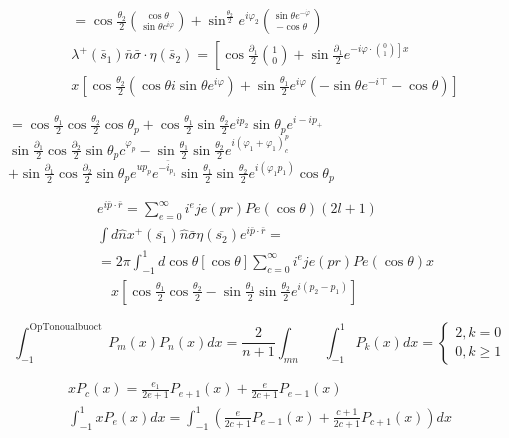 \documentclass[10pt]{article}
\begin{document}
\[\begin{aligned}
& =\cos \frac{\theta_{2}}{2}\binom{\cos \theta}{\sin \theta c^{i \varphi}}+\sin ^{\frac{\theta_{2}}{2}} e^{i \varphi_{2}}\binom{\sin \theta e^{-\dot{\varphi}}}{-\cos \theta} \\
& \lambda^{+}\left(\bar{s}_{1}\right) \bar{n} \bar{\sigma} \cdot \eta\left(\bar{s}_{2}\right)=\left[\cos \frac{\partial_{1}}{2}\binom{1}{0}+\sin \frac{\partial_{1}}{2} e^{\left.-i \varphi \cdot\binom{0}{1}\right] x}\right. \\
& x\left[\cos \frac{\theta_{2}}{2}\left(\cos \theta i \sin \theta e^{i \varphi}\right)+\sin \frac{\theta_{1}}{2} e^{i \varphi}\left(-\sin \theta e^{-i}{ }^{\top}-\cos \theta\right)\right]
\end{aligned}
\]

\(=\cos \frac{\theta_{1}}{2} \cos \frac{\theta_{2}}{2} \cos \theta_{p}+\cos \frac{\theta_{1}}{2} \sin \frac{\theta_{2}}{2} e^{i p_{2}} \sin \theta_{p} e^{i-i p_{+}}\) \(\sin \frac{\partial_{1}}{2} \cos \frac{\partial_{2}}{2} \sin \theta_{p} c^{\varphi_{p}}-\sin \frac{\theta_{1}}{2} \sin \frac{\theta_{2}}{2} e^{i\left(\varphi_{1}+\varphi_{1}\right)_{c}^{p}}\) \(+\sin \frac{\partial_{1}}{2} \cos \frac{\partial_{2}}{2} \sin \theta_{p} e^{u p_{p}} e^{-\bar{i}_{p_{1}}} \sin \frac{\theta_{1}}{2} \sin \frac{\theta_{2}}{2} e^{i\left(\varphi_{1} p_{1}\right)} \cos \theta_{p}\)

\[
\begin{aligned}
& e^{i \bar{p} \cdot \bar{r}}=\sum_{e=0}^{\infty} i^{e} j e(p r) P e(\cos \theta)(2 l+1) \\
& \int d \hat{n} x^{+}\left(\overline{s_{1}}\right) \hat{n} \bar{\sigma} \eta\left(\overline{s_{2}}\right) e^{i \bar{p} \cdot \bar{r}}= \\
& =2 \pi \int_{-1}^{1} d \cos \theta[\cos \theta] \sum_{c=0}^{\infty} i^{e} j e(p r) P e(\cos \theta) x \\
& \quad x\left[\cos \frac{\theta_{1}}{2} \cos \frac{\theta_{2}}{2}-\sin \frac{\theta_{1}}{2} \sin \frac{\theta_{2}}{2} e^{i\left(p_{2}-p_{1}\right)}\right]
\end{aligned}
\]

\[
\int_{-1}^{\text {OpTonoualbuoct }} P_{m}(x) P_{n}(x) d x=\frac{2}{n+1} \int_{m n} \quad \int_{-1}^{1} P_{k}(x) d x=\left\{\begin{array}{l}
2, k=0 \\
0, k \geq 1
\end{array}\right.
\]


\[
\begin{gathered}
x P_{c}(x)=\frac{e_{1}}{2 e+1} P_{e+1}(x)+\frac{e}{2 c+1} P_{e-1}(x) \\
\int_{-1}^{1} x P_{e}(x) d x=\int_{-1}^{1}\left(\frac{e}{2 c+1} P_{e-1}(x)+\frac{c+1}{2 c+1} P_{c+1}(x)\right) d x
\end{gathered}
\]
\end{document}
